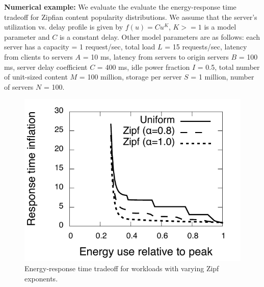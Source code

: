 \textbf{Numerical example:} We evaluate the evaluate the energy-response time tradeoff for Zipfian content popularity distributions. We assume that the server's utilization vs. delay profile is given by $f(u) = Cu^K$, $K>=1$ is a model parameter and $C$ is a constant delay. Other model parameters are as follows: each server has a capacity = 1 request/sec, total load $L$ = 15 requests/sec, latency from clients to servers $A$ = 10 ms, latency from servers to origin servers $B$ = 100 ms, server delay coefficient $C$ = 400 ms, idle power fraction $I$ = 0.5, total number of unit-sized content $M$ = 100 million, storage per server $S$ = 1 million, number of servers $N$ = 100. 

\begin{figure}[t]
\centering
    \includegraphics[scale=0.4]{graphs/vary-z.pdf}

  \caption{Energy-response time tradeoff for workloads with varying Zipf exponents.}
    \label{fig:vary-z}
\end{figure}


